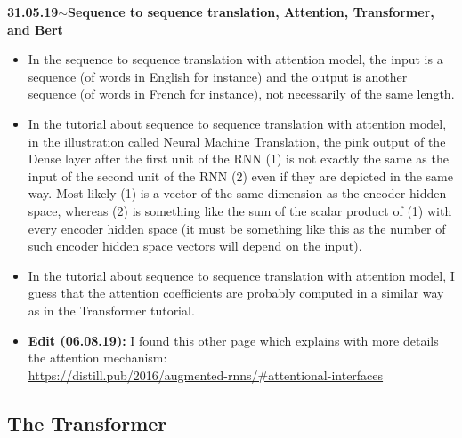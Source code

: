 \documentclass[11pt,a4paper]{article}
\newenvironment{loggentry}[2]%
{\noindent\textbf{#1}\hspace{1cm}$\mathbf{\sim}$\text{ }\textbf{#2}\\}{\vspace{0.5cm}}
\begin{document}
\begin{loggentry}{31.05.19}{Sequence to sequence translation, Attention, Transformer, and Bert}
\begin{itemize}
\item In the sequence to sequence translation with attention model, the input is a sequence (of words in English for instance) and the output is another sequence (of words in French for instance), not necessarily of the same length.
\item In the tutorial about sequence to sequence translation with attention model, in the illustration called Neural Machine Translation, the pink output of the Dense layer after the first unit of the RNN (1) is not exactly the same as the input of the second unit of the RNN (2) even if they are depicted in the same way. Most likely (1) is a vector of the same dimension as the encoder hidden space, whereas (2) is something like the sum of the scalar product of  (1) with every encoder hidden space (it must be something like this as the number of such encoder hidden space vectors will depend on the input).
\item In the tutorial about sequence to sequence translation with attention model, I guess that the attention coefficients are probably computed in a similar way as in the Transformer tutorial.
\item \textbf{Edit (06.08.19):} I found this other page which explains with more details the attention mechanism:\\
\url{https://distill.pub/2016/augmented-rnns/#attentional-interfaces}
\end{itemize}


\subsection{The Transformer}


\end{loggentry}
\end{document}
